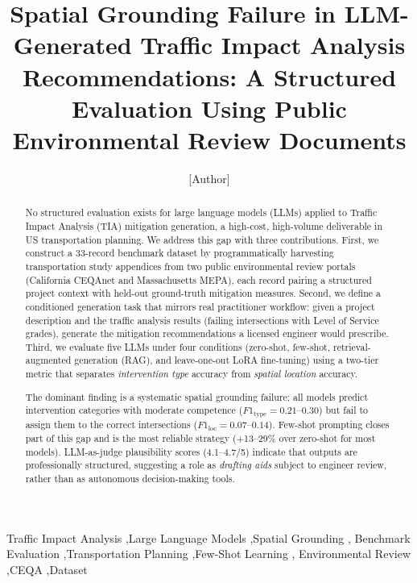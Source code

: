 \documentclass[preprint,12pt]{elsarticle}
\begin{document}
\begin{frontmatter}

\title{Spatial Grounding Failure in LLM-Generated Traffic Impact Analysis Recommendations: A Structured Evaluation Using Public Environmental Review Documents}

\author[1]{[Author]}
\address[1]{[Institution]}
\ead{[email]}

\begin{abstract}
No structured evaluation exists for large language models (LLMs) applied to
Traffic Impact Analysis (TIA) mitigation generation, a high-cost, high-volume
deliverable in US transportation planning.
We address this gap with three contributions.
First, we construct a 33-record benchmark dataset by programmatically harvesting
transportation study appendices from two public environmental review portals
(California CEQAnet and Massachusetts MEPA), each record pairing a structured
project context with held-out ground-truth mitigation measures.
Second, we define a conditioned generation task that mirrors real practitioner
workflow: given a project description and the traffic analysis results (failing
intersections with Level of Service grades), generate the mitigation
recommendations a licensed engineer would prescribe.
Third, we evaluate five LLMs under four conditions (zero-shot, few-shot,
retrieval-augmented generation (RAG), and leave-one-out LoRA fine-tuning)
using a two-tier metric that separates \emph{intervention type} accuracy from
\emph{spatial location} accuracy.

The dominant finding is a systematic spatial grounding failure: all models
predict intervention categories with moderate competence
($F1_\text{type} = 0.21$--$0.30$) but fail to assign them to the correct
intersections ($F1_\text{loc} = 0.07$--$0.14$).
Few-shot prompting closes part of this gap and is the most reliable strategy
($+$13--29\% over zero-shot for most models).
LLM-as-judge plausibility scores (4.1--4.7/5) indicate that outputs are
professionally structured, suggesting a role as \emph{drafting aids} subject
to engineer review, rather than as autonomous decision-making tools.
\end{abstract}

\begin{keyword}
Traffic Impact Analysis \sep Large Language Models \sep Spatial Grounding \sep
Benchmark Evaluation \sep Transportation Planning \sep Few-Shot Learning \sep
Environmental Review \sep CEQA \sep Dataset
\end{keyword}

\end{frontmatter}
\end{document}
